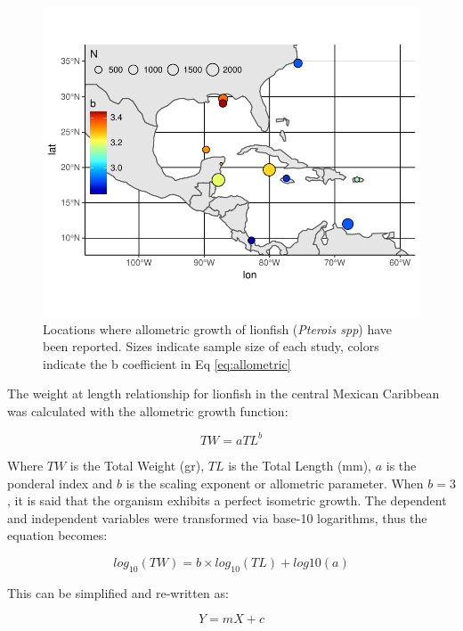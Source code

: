 \documentclass[fleqn,10pt,lineno]{wlpeerj} %
\begin{document}
\begin{figure}
\centering
\includegraphics{Manuscript_files/figure-latex/unnamed-chunk-1-1.pdf}
\caption{\label{fig:unnamed-chunk-1}\label{fig:map}Locations where
allometric growth of lionfish (\emph{Pterois spp}) have been reported.
Sizes indicate sample size of each study, colors indicate the b
coefficient in Eq \ref{eq:allometric}}
\end{figure}

The weight at length relationship for lionfish in the central Mexican
Caribbean was calculated with the allometric growth function:

\begin{equation}
\label{eq:allometric}
TW = aTL^b
\end{equation}

Where \(TW\) is the Total Weight (gr), \(TL\) is the Total Length (mm),
\(a\) is the ponderal index and \(b\) is the scaling exponent or
allometric parameter. When \(b = 3\), it is said that the organism
exhibits a perfect isometric growth. The dependent and independent
variables were transformed via base-10 logarithms, thus the equation
becomes:

\begin{equation}
\label{eq:log-alo}
log_{10}(TW) = b\times log_{10}(TL) + log{10}(a)
\end{equation}

This can be simplified and re-written as:

\begin{equation}
\label{eq:log-alo-trans}
Y = mX + c
\end{equation}
\end{document}
